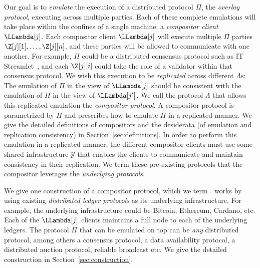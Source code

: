 Our goal is to \emph{emulate} the execution of a distributed protocol $\Pi$,
the \emph{overlay protocol},
executing across multiple parties. Each of these complete emulations will take place
within the confines of a single machine: a \emph{compositor client} $\LLambda[j]$.
Each compositor client $\LLambda[j]$ will execute multiple $\Pi$ parties
$\Z[j][1], \ldots, \Z[j][n]$, and these parties will be allowed to communicate
with one another. For example, $\Pi$ could be a distributed consensus protocol such as
IT Streamlet~\cite{it-streamlet}, and each $\Z[j][i]$ could take the role of a
validator within that consensus protocol. We wish this execution to be \emph{replicated}
across different $\Lambda$s: The emulation of $\Pi$ in the view of $\LLambda[j]$
should be consistent with the emulation of $\Pi$ in the view of $\LLambda[j']$.
We call the protocol $\Lambda$ that allows this replicated emulation the
\emph{compositor protocol}. A compositor protocol is parametrized by $\Pi$
and prescribes how to emulate $\Pi$ in a replicated manner.
We give the detailed definitions of compositors
and the desiderata (of emulation and replication consistency) in Section~\ref{sec:definitions}.
In order to perform this emulation in a replicated manner, the different compositor
clients must use some shared infrastructure $\mathcal{Y}$ that enables the clients
to communicate and maintain consistency in their replication. We term these pre-existing
protocols that the compositor leverages the \emph{underlying protocols}.

We give one construction of a compositor protocol, which we term \emph{\rollerblade}.
\rollerblade works by using existing \emph{distributed ledger protocols} as its underlying infrastructure.
For example, the underlying infrastructure could be Bitcoin, Ethereum, Cardano, etc.
Each of the $\LLambda[j]$ clients maintains a full node to each of the underlying ledgers.
The protocol $\Pi$ that can be emulated on top can be \emph{any} distributed protocol,
among others a consensus protocol, a data availability protocol, a distributed
auction protocol, reliable broadcast etc. We give the detailed \rollerblade construction
in Section~\ref{sec:construction}.

